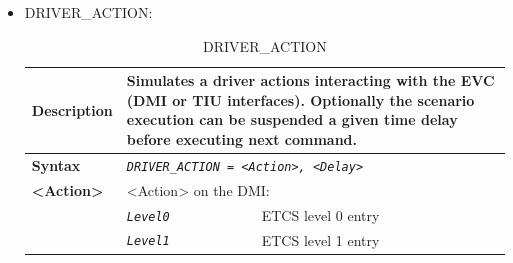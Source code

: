 \documentclass{template/openetcs}
\begin{document}
\begin{itemize}
	\item DRIVER\_ACTION:
	
		\begin{longtable}{|l|l|l|}
			\caption{DRIVER\_ACTION}\\  
			\hline
	
				\begin{minipage}[t]{0.22\linewidth} \textbf{Description} \end{minipage} 
			&	\multicolumn{2}{l|}{ \begin{minipage}[t]{0.78\linewidth} Simulates a driver actions interacting with the EVC (DMI or TIU interfaces). Optionally the scenario execution can be suspended a given time delay before executing next command. \end{minipage} } \\
			
			\hline
						
				\begin{minipage}[t]{0.22\linewidth} \textbf{Syntax}	\end{minipage}
			&	\multicolumn{2}{l|}{ \begin{minipage}[t]{0.78\linewidth} \emph{\texttt{DRIVER\_ACTION = <Action>, <Delay>}}	\end{minipage} } \\
			
			\hline
		
				\multirow{1}{*}{ \begin{minipage}[t]{0.22\linewidth} \textbf{<Action>} \end{minipage} }
			&	\multicolumn{2}{l|}{ \begin{minipage}[t]{0.78\linewidth} <Action> on the DMI: \end{minipage} } \\
			
			\hline
			
			&	\begin{minipage}[t]{0.40\linewidth} \emph{\texttt{Level0}} \end{minipage}
			&	\begin{minipage}[t]{0.38\linewidth} ETCS level 0 entry \end{minipage} \\
			
			\hline
			
			&	\begin{minipage}[t]{0.40\linewidth} \emph{\texttt{Level1}} \end{minipage}
			&	\begin{minipage}[t]{0.38\linewidth} ETCS level 1 entry \end{minipage} \\
			

\end{longtable}
\end{itemize}
\end{document}
